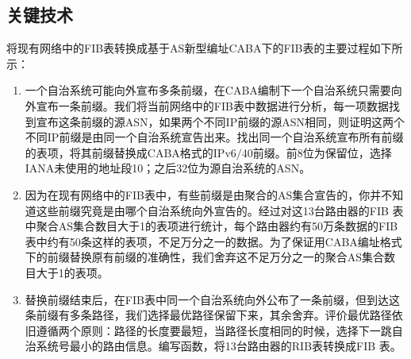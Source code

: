 \subsection{关键技术}
将现有网络中的FIB表转换成基于AS新型编址CABA下的FIB表的主要过程如下所示：
\begin{enumerate}
\item 一个自治系统可能向外宣布多条前缀，在CABA编制下一个自治系统只需要向外宣布一条前缀。我们将当前网络中的FIB表中数据进行分析，每一项数据找到宣布这条前缀的源ASN，如果两个不同IP前缀的源ASN相同，则证明这两个不同IP前缀是由同一个自治系统宣告出来。找出同一个自治系统宣布所有前缀的表项，将其前缀替换成CABA格式的IPv6$/$40前缀。前8位为保留位，选择IANA未使用的地址段10；之后32位为源自治系统的ASN。
\item 因为在现有网络中的FIB表中，有些前缀是由聚合的AS集合宣告的，你并不知道这些前缀究竟是由哪个自治系统向外宣告的。经过对这13台路由器的FIB 表中聚合AS集合数目大于1的表项进行统计，每个路由器约有50万条数据的FIB表中约有50条这样的表项，不足万分之一的数据。为了保证用CABA编址格式下的前缀替换原有前缀的准确性，我们舍弃这不足万分之一的聚合AS集合数目大于1的表项。
\item 替换前缀结束后，在FIB表中同一个自治系统向外公布了一条前缀，但到达这条前缀有多条路径，我们选择最优路径保留下来，其余舍弃。评价最优路径依旧遵循两个原则：路径的长度要最短，当路径长度相同的时候，选择下一跳自治系统号最小的路由信息。编写函数，将13台路由器的RIB表转换成FIB 表。
\end{enumerate}

